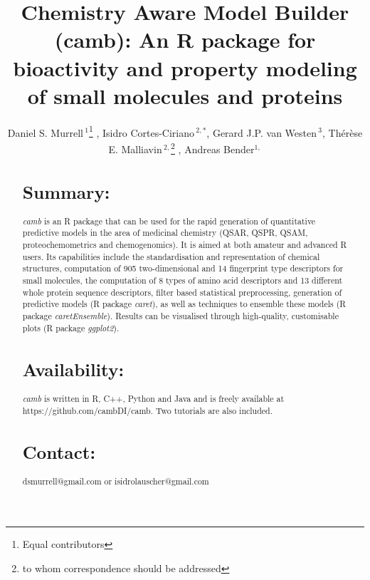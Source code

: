 \documentclass{bioinfo}
\begin{document}

\title{Chemistry Aware Model Builder (camb): An R package for bioactivity and property modeling of small molecules and proteins}
\author[Murrell \& Cortes-Ciriano \it{et~al}]{Daniel S. Murrell\,$^{1}$\footnote{Equal contributors} , Isidro Cortes-Ciriano\,$^{2,*}$, Gerard J.P. van Westen\,$^{3}$, Th\'er\`ese E. Malliavin\,$^{2,}$\footnote{to whom correspondence should be addressed} , Andreas Bender$^{1,}$\dag}
\address{$^{1}$Unilever Centre for Molecular Science Informatics, Department of Chemistry, University of Cambridge, Cambridge, United Kingdom.\\
$^{2}$Unite de Bioinformatique Structurale, Institut Pasteur and CNRS UMR 3825, Structural Biology and Chemistry Department, 25, rue Dr. Roux, 75 724 Paris, France.\\
$^{3}$European Molecular Biology Laboratory European Bioinformatics Institute Wellcome Trust Genome Campus, Hinxton, United Kingdom.}


\begin{abstract}
\section{Summary:}
{\it camb} is an R package that can be used for the rapid generation of quantitative predictive models in the area of medicinal chemistry (QSAR, QSPR, QSAM, proteochemometrics and chemogenomics). It is aimed at both amateur and advanced R users.
Its capabilities include the standardisation and representation of chemical structures, computation of 905 two-dimensional and 14 fingerprint type descriptors for small molecules, the computation of 8 types of amino acid descriptors and 13 different whole protein sequence descriptors, filter based statistical preprocessing, generation of predictive models (R package {\it caret}), as well as techniques to ensemble these models (R package {\it caretEnsemble}).
Results can be visualised through high-quality, customisable plots (R package {\it ggplot2}).
\section{Availability:} {\it camb} is written in R, C++, Python and Java and is freely available
at https://github.com/cambDI/camb.
Two tutorials are also included.\\
\section{Contact:} dsmurrell@gmail.com or isidrolauscher@gmail.com
\end{abstract}
\end{document}
